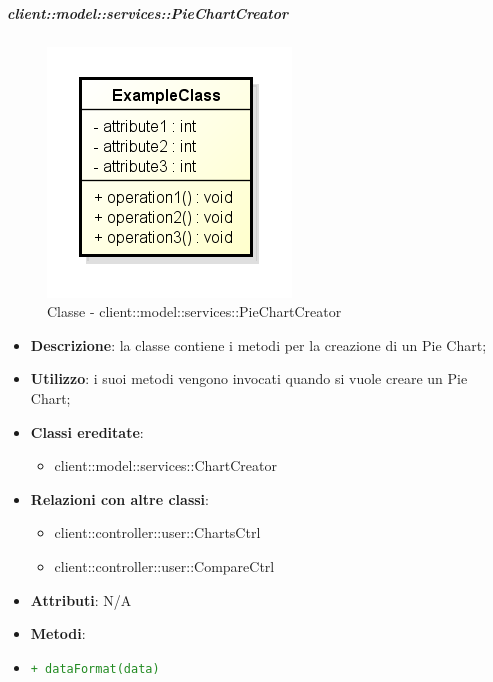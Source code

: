 		\subparagraph{client::model::services::PieChartCreator} %
		\label{subp:piechartcreator}
			\begin{figure}[htbp]
				\centering
				\centerline{\includegraphics[scale=0.7]{./images/client/classes/example_class.png}}
				\caption{Classe - client::model::services::PieChartCreator}
			\end{figure}
			\begin{itemize}
				\item \textbf{Descrizione}: la classe contiene i metodi per la creazione di un Pie Chart;
				\item \textbf{Utilizzo}: i suoi metodi vengono invocati quando si vuole creare un Pie Chart;
				\item \textbf{Classi ereditate}:
					\begin{itemize}
						\item client::model::services::ChartCreator
					\end{itemize}
				\item \textbf{Relazioni con altre classi}:
					\begin{itemize}
						\item client::controller::user::ChartsCtrl
						\item client::controller::user::CompareCtrl
					\end{itemize}
				\item \textbf{Attributi}: N/A
				\item \textbf{Metodi}: 
					\item \textcolor{forestgreen}{\texttt{+ dataFormat(data)}}
			\end{itemize}

